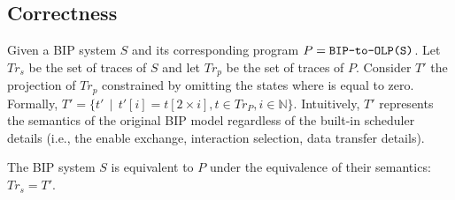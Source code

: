 \subsection{Correctness}
%
Given a BIP system $S$ and its corresponding \caig program $P = \texttt{BIP-to-OLP(S)}$. 
Let $Tr_s$ be the set of traces of $S$ and let $Tr_p$ be the set of traces of $P$. 
Consider $T'$ the projection of $Tr_p$ constrained by omitting the states where  is equal to zero. 
Formally, $T'  = \{t' \,\mid\, t'[i] = t[2\times i], t \in Tr_P, i \in \mathbb{N}\}$. 
Intuitively, $T'$ represents the semantics of the original BIP model regardless of the built-in scheduler details 
(i.e., the enable exchange, interaction selection, data transfer details). 
%
\begin{theorem}
\label{theorem:correct}
The BIP system $S$ is equivalent to $P$ under the equivalence of their semantics: $Tr_s=T'$.  
\end{theorem}
